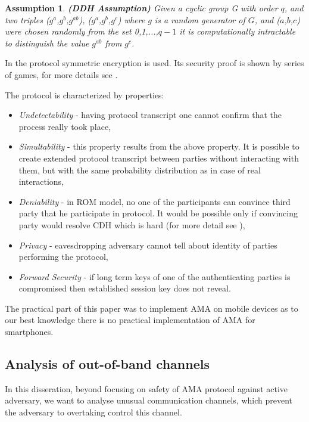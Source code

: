 \documentclass[11pt,titlepage]{article}
\theoremstyle{plain}
\newtheorem{assumption}{Assumption}
\begin{document}
\begin{assumption}
	\textbf{(DDH Assumption)} 
	Given a cyclic group G with order $q$, and two triples ($g^a$,$g^b$,$g^{ab}$), ($g^a$,$g^b$,$g^{c}$)  where $g$ 
	is a random generator of $G$, and ($a$,$b$,$c$) were chosen randomly from the set {0,1,...,$q-1$} it is computationally intractable to distinguish the value $g^{ab}$ from $g^{c}$.
\end{assumption}

In the protocol symmetric encryption is used. Its security proof is shown by series of games, for more details see \cite{AMA}. 

\vspace{5mm}

The protocol is characterized by properties:
 \begin{itemize}
 	
 	\item \textit{Undetectability} - having protocol transcript one cannot confirm that the process really took place,
 	\item \textit{Simultability} - this property results from the above property. It is possible to create extended protocol transcript between parties without interacting with them, but with the same probability distribution as in case of real interactions,
 	\item \textit{Deniability} - in ROM model, no one of the participants can convince third party that he participate in protocol. It would be possible only if convincing party would resolve CDH which is hard (for more detail see \cite{AMA}), 
 	\item \textit{Privacy} - eavesdropping adversary cannot tell about identity of parties performing the protocol,
 	\item \textit{Forward Security} - if long term keys of one of the authenticating parties is compromised then established session key does not reveal.
 	

 \end{itemize}

\vspace{5mm}



The practical part of this paper was to implement AMA on mobile devices as to our best knowledge there is no practical implementation of AMA for smartphones.




\subsection{Analysis of out-of-band channels}
In this disseration, beyond focusing on safety of AMA protocol against active adversary, we want to analyse unusual communication channels, which prevent the adversary to overtaking control this channel.
\end{document}
